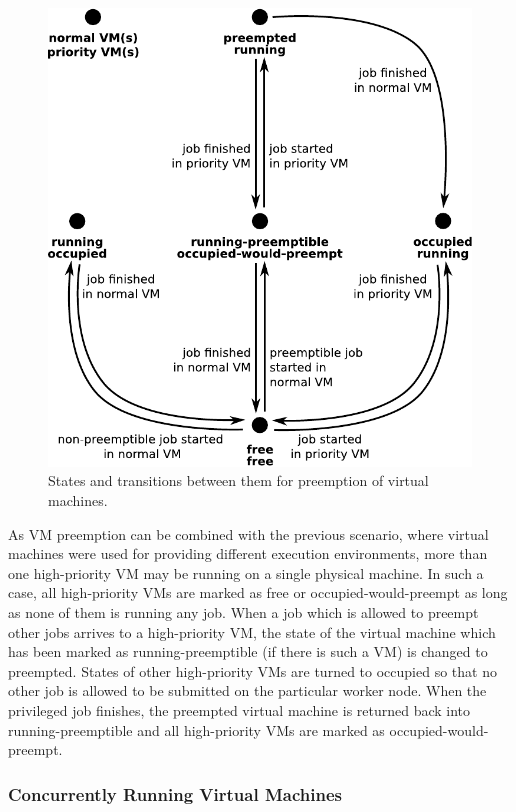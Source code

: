\documentclass{sigplanconf}
\begin{document}
\begin{figure}[tb]
    \includegraphics[width=\columnwidth]{preemption}
    \caption{States and transitions between them for preemption of virtual
        machines.}
    \label{fig:preemption}
\end{figure}

As VM preemption can be combined with the previous scenario, where virtual
machines were used for providing different execution environments, more than
one high-priority VM may be running on a single physical machine. In such a
case, all high-priority VMs are marked as free or occupied-would-preempt as
long as none of them is running any job. When a job which is allowed to
preempt other jobs arrives to a high-priority VM, the state of the virtual
machine which has been marked as running-preemptible (if there is such a VM)
is changed to preempted. States of other high-priority VMs are turned to
occupied so that no other job is allowed to be submitted on the particular
worker node. When the privileged job finishes, the preempted virtual machine
is returned back into running-preemptible and all high-priority VMs are marked
as occupied-would-preempt.

\subsubsection{Concurrently Running Virtual Machines}
\end{document}
